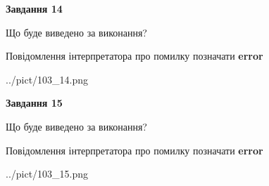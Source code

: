 \documentclass[11pt, ukrainian]{article}
\begin{document}
{\begin {large}
{\begin {center}\textbf{Завдання 14}\end {center}}\par
Що буде виведено за виконання? \par
Повідомлення інтерпретатора про помилку позначати \textbf{error}

\begin{center}
	{../pict/103_14.png}
\end{center}
\newpage

{\begin {center}\textbf{Завдання 15}\end {center}}\par
Що буде виведено за виконання? \par
Повідомлення інтерпретатора про помилку позначати \textbf{error}

\begin{center}
	{../pict/103_15.png}
\end{center}
\newpage

\end {large}}
\end{document}
